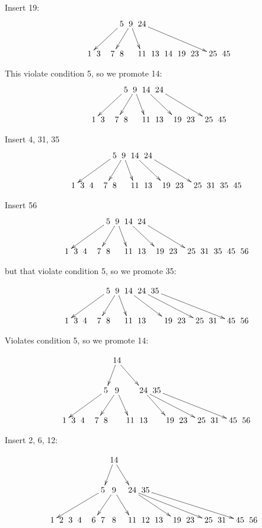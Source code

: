 \documentclass[a4paper]{article}
\begin{document}
Insert 19:
$$\xymatrix @C=0pt {
 &  &  &  &  &  & \ar[dllll] 5  &\ar[dll] 9 \ar[dr] &           24 \ar[drrrrrr] &  \\
 &  & 1& 3&  & 7 & 8  &                   & 11 & 13 & 14 & 19 &23 &  & 25 & 45 \\
}$$

This violate condition 5, so we promote 14:
$$\xymatrix @C=0pt {
 &  &  &  &  &  & \ar[dllll] 5  &\ar[dll] 9 \ar[dr] & 14\ar[drrr] &          24 \ar[drrrrr] &  \\
 &  & 1& 3&  & 7 & 8  &                   & 11 & 13 &  & 19 &23 &  & 25 & 45 \\
}$$

Insert 4, 31, 35
$$\xymatrix @C=0pt {
 &  &  &  &  &  & \ar[dlllll] 5  &\ar[dll] 9 \ar[dr] & 14\ar[drrr] &          24 \ar[drrrrr] &  \\
 & 1 & 3& 4&  & 7 & 8  &                   & 11 & 13 &  & 19 &23 &  & 25 & 31 & 35 & 45 \\
}$$

Insert 56
$$\xymatrix @C=0pt {
 &  &  &  &  &  & \ar[dlllll] 5  &\ar[dll] 9 \ar[dr] & 14\ar[drrr] &          24 \ar[drrrrr] &  \\
 & 1 & 3& 4&  & 7 & 8  &                   & 11 & 13 &  & 19 &23 &  & 25 & 31 & 35 & 45 & 56\\
}$$

but that violate condition 5, so we promote 35:

$$\xymatrix @C=0pt {
 &  &  &  &  &  & \ar[dlllll] 5  &\ar[dll] 9 \ar[dr] & 14\ar[drrr] &          24 \ar[drrrrr] &  35 \ar[drrrrrrr] \\
 & 1 & 3& 4&  & 7 & 8  &                   & 11 & 13 &  & 19 &23 &  & 25 & 31 &  & 45 & 56\\
}$$

Violates condition 5, so we promote 14:

$$\xymatrix @C=0pt {
 &  &  &  &  &  &                &\ar[dl]14\ar[drr] \\
 &  &  &  &  &  & \ar[dlllll] 5  &\ar[dll] 9 \ar[dr] & &\ar[drr]           24 \ar[drrrrr] &  35 \ar[drrrrrrr] \\
 & 1 & 3& 4&  & 7 & 8  &                   & 11 & 13 &  & 19 &23 &  & 25 & 31 &  & 45 & 56\\
}$$

Insert 2, 6, 12:

$$\xymatrix @C=0pt {
 &  &  &  &  &  &                &\ar[dl]14\ar[drr] \\
 &  &  &  &  &  & \ar[dllllll] 5  &\ar[dll] 9 \ar[drr] & &\ar[drrrr]           24 \ar[drrrrrrr] &  35 \ar[drrrrrrrrr] \\
 1 & 2 & 3& 4&  & 6 & 7  & 8 &                   & 11 & 12 & 13 &  & 19 &23 &  & 25 & 31 &  & 45 & 56\\
}$$
\end{document}
